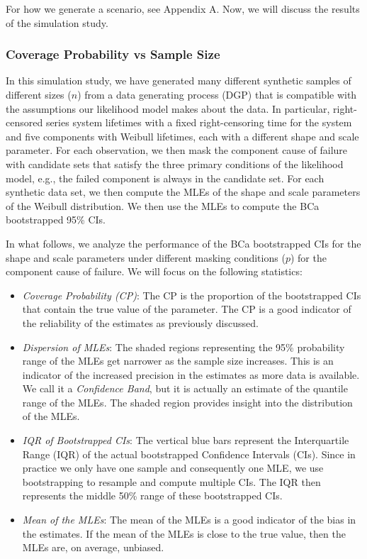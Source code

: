 \documentclass[
]{article}
\begin{document}
For how we generate a scenario, see Appendix A. Now, we will discuss the
results of the simulation study.

\hypertarget{coverage-probability-vs-sample-size}{%
\subsubsection{Coverage Probability vs Sample
Size}\label{coverage-probability-vs-sample-size}}

In this simulation study, we have generated many different synthetic
samples of different sizes (\(n\)) from a data generating process (DGP)
that is compatible with the assumptions our likelihood model makes about
the data. In particular, right-censored series system lifetimes with a
fixed right-censoring time for the system and five components with
Weibull lifetimes, each with a different shape and scale parameter. For
each observation, we then mask the component cause of failure with
candidate sets that satisfy the three primary conditions of the
likelihood model, e.g., the failed component is always in the candidate
set. For each synthetic data set, we then compute the MLEs of the shape
and scale parameters of the Weibull distribution. We then use the MLEs
to compute the BCa bootstrapped 95\% CIs.

In what follows, we analyze the performance of the BCa bootstrapped CIs
for the shape and scale parameters under different masking conditions
(\(p\)) for the component cause of failure. We will focus on the
following statistics:

\begin{itemize}
\item
  \emph{Coverage Probability (CP)}: The CP is the proportion of the
  bootstrapped CIs that contain the true value of the parameter. The CP
  is a good indicator of the reliability of the estimates as previously
  discussed.
\item
  \emph{Dispersion of MLEs}: The shaded regions representing the 95\%
  probability range of the MLEs get narrower as the sample size
  increases. This is an indicator of the increased precision in the
  estimates as more data is available. We call it a \emph{Confidence
  Band}, but it is actually an estimate of the quantile range of the
  MLEs. The shaded region provides insight into the distribution of the
  MLEs.
\item
  \emph{IQR of Bootstrapped CIs}: The vertical blue bars represent the
  Interquartile Range (IQR) of the actual bootstrapped Confidence
  Intervals (CIs). Since in practice we only have one sample and
  consequently one MLE, we use bootstrapping to resample and compute
  multiple CIs. The IQR then represents the middle 50\% range of these
  bootstrapped CIs.
\item
  \emph{Mean of the MLEs}: The mean of the MLEs is a good indicator of
  the bias in the estimates. If the mean of the MLEs is close to the
  true value, then the MLEs are, on average, unbiased.
\end{itemize}
\end{document}
